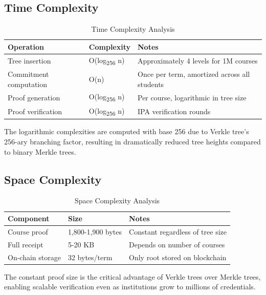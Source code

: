 \subsection{Time Complexity}
\label{subsec:time-complexity}

\begin{table}[H]
\centering
\caption{Time Complexity Analysis}
\label{tab:time-complexity}
\begin{tabular}{|p{4.5cm}|p{3cm}|p{5.5cm}|}
\hline
\textbf{Operation} & \textbf{Complexity} & \textbf{Notes} \\
\hline
Tree insertion & O(log\textsubscript{256} n) & Approximately 4 levels for 1M courses \\
\hline
Commitment computation & O(n) & Once per term, amortized across all students \\
\hline
Proof generation & O(log\textsubscript{256} n) & Per course, logarithmic in tree size \\
\hline
Proof verification & O(log\textsubscript{256} n) & IPA verification rounds \\
\hline
\end{tabular}
\end{table}

The logarithmic complexities are computed with base 256 due to Verkle tree's 256-ary branching factor, resulting in dramatically reduced tree heights compared to binary Merkle trees.

\subsection{Space Complexity}
\label{subsec:space-complexity}

\begin{table}[H]
\centering
\caption{Space Complexity Analysis}
\label{tab:space-complexity}
\begin{tabular}{|p{4.5cm}|p{3cm}|p{5.5cm}|}
\hline
\textbf{Component} & \textbf{Size} & \textbf{Notes} \\
\hline
Course proof & 1,800-1,900 bytes & Constant regardless of tree size \\
\hline
Full receipt & 5-20 KB & Depends on number of courses \\
\hline
On-chain storage & 32 bytes/term & Only root stored on blockchain \\
\hline
\end{tabular}
\end{table}

The constant proof size is the critical advantage of Verkle trees over Merkle trees, enabling scalable verification even as institutions grow to millions of credentials.

